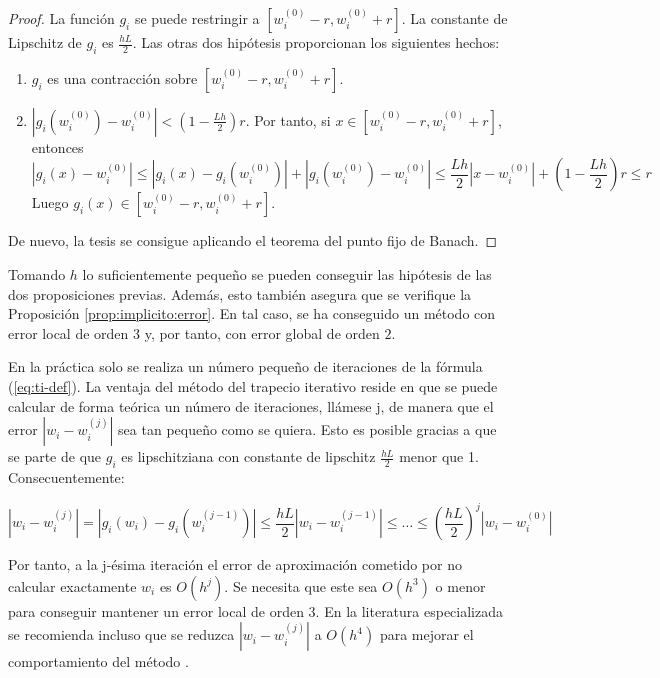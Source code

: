 \documentclass{article}
\theoremstyle{theorem-style}  %
\theoremstyle{definition-style}
\theoremstyle{example-style}
\begin{document}
	\begin{proof}
		La función $g_i$ se puede restringir a $[w_i^{(0)}-r,w_i^{(0)}+r]$. La constante de Lipschitz de $g_i$ es $\frac{hL}{2}$. Las otras dos hipótesis proporcionan los siguientes hechos:
		
		\begin{enumerate}
			\item $g_i$ es una contracción sobre $[w_i^{(0)}-r,w_i^{(0)}+r]$.
			\item $\left|g_i(w_i^{(0)}) - w_i^{(0)}\right| < (1-\frac{Lh}{2})r$. Por tanto, si $x \in [w_i^{(0)}-r,w_i^{(0)}+r]$, entonces 
			$$ \left|g_i(x) - w_i^{(0)}\right| \le \left|g_i(x) - g_i(w_i^{(0)})\right| + \left|g_i(w_i^{(0)}) - w_i^{(0)}\right| \le \frac{Lh}{2} \left|x - w_i^{(0)}\right| + (1-\frac{Lh}{2})r \le r $$
			Luego $g_i(x) \in [w_i^{(0)}-r,w_i^{(0)}+r]$.
		\end{enumerate}


		De nuevo, la tesis se consigue aplicando el teorema del punto fijo de Banach.
	\end{proof}

	Tomando $h$ lo suficientemente pequeño se pueden conseguir las hipótesis de las dos proposiciones previas. Además, esto también asegura que se verifique la Proposición \ref{prop:implicito:error}.  En tal caso, se ha conseguido un método con error local de orden $3$ y, por tanto, con error global de orden $2$.
	
	En la práctica solo se realiza un número pequeño de iteraciones de la fórmula (\ref{eq:ti-def}). La ventaja del método del trapecio iterativo reside en que se puede calcular de forma teórica un número de iteraciones, llámese j, de manera que el error $\left|w_i - w_i^{(j)}\right|$ sea tan pequeño como se quiera. Esto es posible gracias a que se parte de que $g_i$ es lipschitziana con constante de lipschitz $\frac{hL}{2}$ menor que 1. Consecuentemente:
	
	$$ \left|w_i - w_i^{(j)}\right| = \left|g_i(w_i) - g_i(w_i^{(j-1)})\right| \le \frac{hL}{2} \left|w_i - w_i^{(j-1)}\right| \le \ldots \le \left(\frac{hL}{2}\right)^j \left|w_i - w_i^{(0)}\right| $$
	
	Por tanto, a la j-ésima iteración el error de aproximación cometido por no calcular exactamente $w_i$ es $O(h^j)$. Se necesita que este sea $O(h^3)$ o menor para conseguir mantener un error local de orden $3$. En la literatura especializada se recomienda incluso que se reduzca $\left|w_i - w_i^{(j)}\right|$ a $O(h^4)$ para mejorar el comportamiento del método \cite{akitson}.
	
\end{document}
